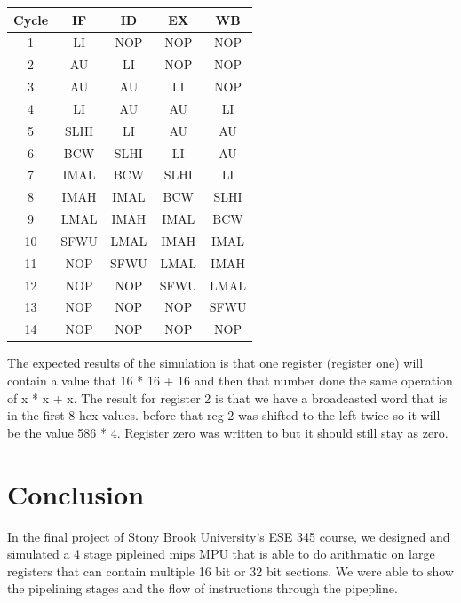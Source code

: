 \documentclass{article}
\begin{document}
\begin{center}
	\begin{tabular} {|c||c|c|c|c|}
		\hline
		Cycle & IF & ID & EX & WB \\
		\hline
		\hline
		1 & LI & NOP & NOP & NOP \\
		\hline
		2 & AU & LI & NOP & NOP \\
		\hline
		3 & AU & AU & LI & NOP \\
		\hline
		4 & LI & AU & AU & LI \\
		\hline
		5 & SLHI & LI & AU & AU \\
		\hline
		6 & BCW & SLHI & LI & AU \\
		\hline
		7 & IMAL & BCW & SLHI & LI \\
		\hline
		8 & IMAH & IMAL & BCW & SLHI \\
		\hline
		9 & LMAL & IMAH & IMAL & BCW \\
		\hline
		10 & SFWU & LMAL & IMAH & IMAL \\
		\hline
		11 & NOP & SFWU & LMAL & IMAH \\
		\hline
		12 & NOP & NOP & SFWU & LMAL \\
		\hline
		13 & NOP & NOP & NOP & SFWU \\
		\hline
		14 & NOP & NOP & NOP & NOP \\
		\hline
	\end{tabular}
\end{center}

The expected results of the simulation is that one register (register one) will contain a value that 16 * 16 + 16 and then that number done the same operation of x * x + x. The result for register 2 is that we have a broadcasted word that is in the first 8 hex values. before that reg 2 was shifted to the left twice so it will be the value 586 * 4. Register zero was written to but it should still stay as zero.

\section{Conclusion}

In the final project of Stony Brook University's ESE 345 course, we designed and simulated a 4 stage pipleined mips MPU that is able to do arithmatic on large registers that can contain multiple 16 bit or 32 bit sections. We were able to show the pipelining stages and the flow of instructions through the pipepline.
\end{document}
